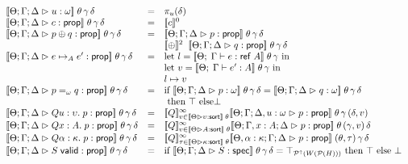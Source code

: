 \begin{figure}
\begin{displaymath}
\begin{array}{lcl}
\interp{\judgeA{u}{\omega}}\;\theta\,\gamma\,\delta & = & \pi_u(\delta) \\

\interp{\judgeA{c}{\assert}}\;\theta\,\gamma\,\delta & = & \interp{c}^0 \\

\interp{\judgeA{p \oplus q}{\assert}}\;\theta\,\gamma\,\delta & = & 
    \interp{\judgeA{p}{\assert}}\;\theta\,\gamma\,\delta \\
& & \interp{\oplus}^2\;\;\interp{\judgeA{q}{\assert}}\;\theta\,\gamma\,\delta \\

\interp{\judgeA{e \pointsto_A e'}{\assert}}\;\theta\,\gamma\,\delta & = & 
    \mbox{let } l = \interp{\judgeE{\Gamma}{e}{\reftype{A}}}\;\theta\,\gamma \mbox{ in}\\
& & \mbox{let } v = \interp{\judgeE{\Gamma}{e'}{A}}\;\theta\,\gamma \mbox{ in} \\
& & l \pointsto v \\


\interp{\judgeA{p =_\omega q}{\assert}}\;\theta\,\gamma\,\delta & = & 
   \mbox{if }\interp{\judgeA{p}{\omega}}\;\theta\,\gamma\,\delta = \interp{\judgeA{q}{\omega}}\;\theta\,\gamma\,\delta \\
   & & \mbox{ then } \top \mbox{ else} \bot \\

\interp{\judgeA{Q u:\upsilon.\; p}{\assert}}\;\theta\,\gamma\,\delta & = & 
  \interp{Q}^\infty_{v \in \interp{\judgeSort{\upsilon}}\;\theta}
    \interp{\judgeA[\Theta; \Gamma; \Delta, u:\omega]{p}{\assert}}\;\theta\,\gamma\,(\delta, v) \\

\interp{\judgeA{Q x:A.\; p}{\assert}}\;\theta\,\gamma\,\delta & = & 
  \interp{Q}^\infty_{v \in \interp{\judgeSort{A}}\;\theta}
    \interp{\judgeA[\Theta; \Gamma, x:A; \Delta]{p}{\assert}}\;\theta\,(\gamma,v)\,\delta \\

\interp{\judgeA{Q \alpha:\kappa.\; p}{\assert}}\;\theta\,\gamma\,\delta & = & 
  \interp{Q}^\infty_{\tau \in \interp{\judgeSort{\kappa}}\;\theta}
    \interp{\judgeA[\Theta, \alpha:\kappa; \Gamma; \Delta]{p}{\assert}}\;(\theta, \tau)\,\gamma\,\delta \\


\interp{\judgeA{\validprop{S}}{\assert}}\;\theta\,\gamma\,\delta & = & 
   \mbox{if } \interp{\judgeS{S}}\;\theta\,\gamma\,\delta = \top_{\upset{W(\powerset{H})}}
   \mbox{ then } \top
   \mbox{ else } \bot \\


\end{array}
\end{displaymath}
\end{figure}
